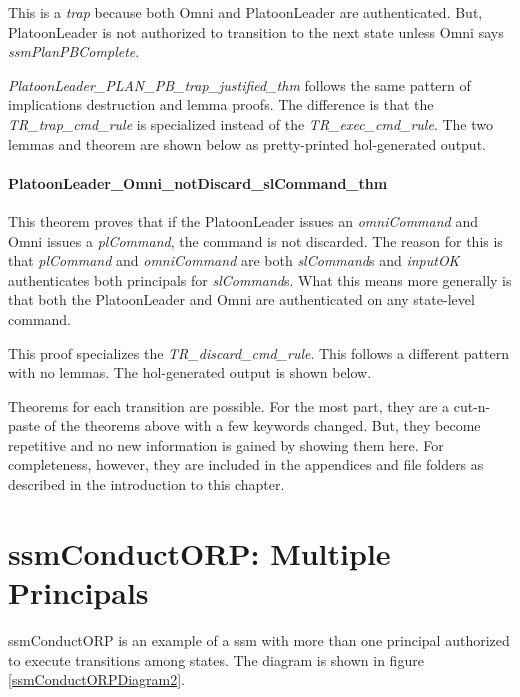 \documentclass[../../main/main.tex]{subfiles}
\begin{document}
This is a \textit{trap} because both Omni and PlatoonLeader are authenticated.  But, PlatoonLeader is not authorized to transition to the next state unless Omni says \textit{ssmPlanPBComplete}.



\textit{PlatoonLeader_PLAN_PB_trap_justified_thm} follows the same pattern of implications destruction and lemma proofs.  The difference is that the \textit{TR_trap_cmd_rule} is specialized instead of the \textit{TR_exec_cmd_rule}.  The two lemmas and theorem are shown below as pretty-printed \gls{hol}-generated output.  

\HOLssmPBIntegratedTheoremsPlatoonLeaderXXPLANXXPBXXtrapXXlemma
{}\HOLssmPBIntegratedTheoremsPlatoonLeaderXXPLANXXPBXXtrapXXjustifiedXXlemma
\HOLssmPBIntegratedTheoremsPlatoonLeaderXXPLANXXPBXXtrapXXjustifiedXXthm

\paragraph*{PlatoonLeader_Omni_notDiscard_slCommand_thm}
This theorem proves that if the PlatoonLeader issues an \textit{omniCommand} and Omni issues a \textit{plCommand}, the command is not discarded.  The reason for this is that \textit{plCommand} and \textit{omniCommand} are both \textit{slCommand}s and  \textit{inputOK} authenticates both principals for \textit{slCommand}s.  What this means more generally is that both the PlatoonLeader and Omni are authenticated on any state-level command.

This proof specializes the \textit{TR_discard_cmd_rule}.  This follows a different pattern with no lemmas.  The \gls{hol}-generated output is shown below.

\HOLssmPBIntegratedTheoremsPlatoonLeaderXXOmniXXnotDiscardXXslCommandXXthm

Theorems for each transition are possible. For the most part, they are a cut-n-paste of the theorems above with a few keywords changed.  But, they become repetitive and no new information is gained by showing them here. For completeness, however, they are included in the appendices and file folders as described in the introduction to this chapter.
\section{ssmConductORP: Multiple Principals}
ssmConductORP is an example of a \gls{ssm} with more than one principal authorized to execute transitions among states. The diagram is shown in figure \ref{ssmConductORPDiagram2}.
\end{document}
